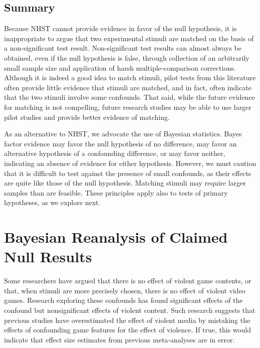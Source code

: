 \documentclass[man]{apa6}
\begin{document}
\subsection{Summary}
Because NHST cannot provide evidence in favor of the null hypothesis, it is inappropriate to argue that two experimental stimuli are matched on the basis of a non-significant test result.  Non-significant test results can almost always be obtained, even if the null hypothesis is false, through collection of an arbitrarily small sample size and application of harsh multiple-comparison corrections.  Although it is indeed a good idea to match stimuli, pilot tests from this literature often provide little evidence that stimuli are matched, and in fact, often indicate that the two stimuli involve some confounds. That said, while the future evidence for matching is not compelling, future research studies may be able to use larger pilot studies and provide better evidence of matching. %
 
As an alternative to NHST, we advocate the use of Bayesian statistics. Bayes factor evidence may favor the null hypothesis of no difference, may favor an alternative hypothesis of a confounding difference, or may favor neither, indicating an absence of evidence for either hypothesis. However, we must caution that it is difficult to test against the presence of small confounds, as their effects are quite like those of the null hypothesis. Matching stimuli may require larger samples than are feasible.  
These principles apply also to tests of primary hypotheses, as we explore next.

\section{Bayesian Reanalysis of Claimed Null Results}
Some researchers have argued that there is no effect of violent game contents, or that, when stimuli are more precisely chosen, there is no effect of violent video games. Research exploring these confounds has found significant effects of the confound but nonsignificant effects of violent content. Such research suggests that previous studies have overestimated the effect of violent media by mistaking the effects of confounding game features for the effect of violence. If true, this would indicate that effect size estimates from previous meta-analyses \citep[e.g., $r = .21$,][]{Anderson:etal:2010} are in error.  
\end{document}
